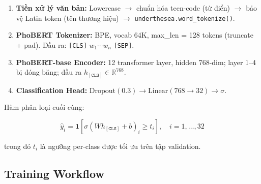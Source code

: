 \documentclass[12pt, a4paper]{report}
\begin{document}
\begin{enumerate}
  \item \textbf{Tiền xử lý văn bản:}
        Lowercase $\rightarrow$ chuẩn hóa teen-code (từ điển) $\rightarrow$
        bảo vệ Latin token (tên thương hiệu) $\rightarrow$
        \texttt{underthesea.word\_tokenize()}.
  \item \textbf{PhoBERT Tokenizer:} BPE, vocab 64K, max\_len = 128 tokens
        (truncate + pad). Đầu ra: \texttt{[CLS]} $w_1 \cdots w_n$ \texttt{[SEP]}.
  \item \textbf{PhoBERT-base Encoder:} 12 transformer layer, hidden 768-dim;
        layer 1--4 bị đóng băng; đầu ra $h_{[\texttt{CLS}]} \in \mathbb{R}^{768}$.
  \item \textbf{Classification Head:}
        $\text{Dropout}(0.3) \rightarrow \text{Linear}(768 \rightarrow 32)
        \rightarrow \sigma$.
\end{enumerate}

Hàm phân loại cuối cùng:

\begin{equation}
  \hat{y}_i = \mathbf{1}\!\left[\sigma\!\left(W h_{[\texttt{CLS}]} + b\right)_i \geq t_i\right],
  \quad i = 1, \ldots, 32
\end{equation}

trong đó $t_i$ là ngưỡng per-class được tối ưu trên tập validation.

\subsection{Training Workflow}
\label{subsec:approach3_workflow}
\end{document}
